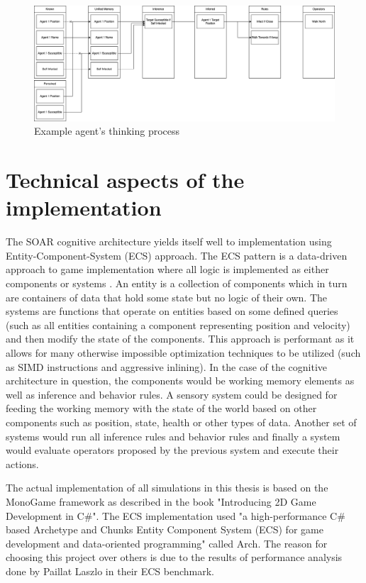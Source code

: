 \begin{figure}[H]
    \centering
    \includegraphics[width=1.0\textwidth]{images/chapter1/agent_think.drawio.png}
    \caption{Example agent's thinking process}\label{fig:agent_think.drawio.png}
\end{figure}

\section{Technical aspects of the implementation}

The SOAR cognitive architecture yields itself well to implementation using Entity-Component-System (ECS) approach.
The ECS pattern is a data-driven approach to game implementation where all logic is implemented as either components or systems \cite{raffaillac2019polyphony}.
An entity is a collection of components which in turn are containers of data that hold some state but no logic of their own.
The systems are functions that operate on entities based on some defined queries (such as all entities containing a component representing position and velocity) and then modify the state of the components.
This approach is performant as it allows for many otherwise impossible optimization techniques to be utilized (such as SIMD instructions and aggressive inlining)\cite{harkonen2019advantages}.
In the case of the cognitive architecture in question, the components would be working memory elements as well as inference and behavior rules.
A sensory system could be designed for feeding the working memory with the state of the world based on other components such as position, state, health or other types of data.
Another set of systems would run all inference rules and behavior rules and finally a system would evaluate operators proposed by the previous system and execute their actions.

The actual implementation of all simulations in this thesis is based on the MonoGame framework as described in the book "Introducing 2D Game Development in C\#"\cite{pavleas2013introducing}.
The ECS implementation used "a high-performance C\# based Archetype and Chunks Entity Component System (ECS) for game development and data-oriented programming" called Arch\cite{matthaeus2023arch}.
The reason for choosing this project over others is due to the results of performance analysis done by Paillat Laszlo in their ECS benchmark\cite{laszlo2023arch}.

